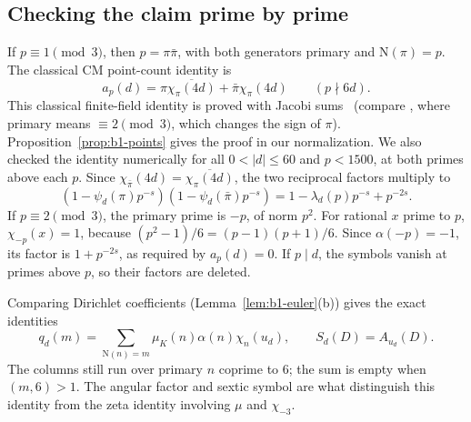 \documentclass[11pt]{article}
\numberwithin{equation}{section}
\newcommand{\N}{\mathrm N}
\newcommand{\muk}{\mu_K}
\begin{document}
\subsection{Checking the claim prime by prime}
If $p\equiv1\pmod3$, then $p=\pi\bar\pi$, with both generators primary
and $\N(\pi)=p$. The classical CM point-count identity is
\begin{equation}\label{eq:point-identity}
 a_p(d)=\pi\overline{\chi_\pi(4d)}
       +\bar\pi\chi_\pi(4d)\qquad(p\nmid6d).
\end{equation}
This classical finite-field identity is proved with Jacobi sums~\cite[Chapter~8]{IR} (compare
\cite[Chapter~18]{IR}, where primary means $\equiv2\pmod3$, which changes the sign of $\pi$).
Proposition~\ref{prop:b1-points} gives the proof in our normalization. We also checked the identity
numerically for all $0<|d|\le60$ and $p<1500$, at both primes above each $p$. Since
$\chi_{\bar\pi}(4d)=\overline{\chi_\pi(4d)}$, the two reciprocal
factors multiply to
\begin{equation}\label{eq:d011}
 (1-\psi_d(\pi)p^{-s})(1-\psi_d(\bar\pi)p^{-s})
 =1-\lambda_d(p)p^{-s}+p^{-2s}.
\end{equation}
If $p\equiv2\pmod3$, the primary prime is $-p$, of norm $p^2$.
For rational $x$ prime to $p$, $\chi_{-p}(x)=1$, because
$(p^2-1)/6=(p-1)(p+1)/6$. Since $\alpha(-p)=-1$, its factor is
$1+p^{-2s}$, as required by $a_p(d)=0$. If $p\mid d$, the symbols
vanish at primes above $p$, so their factors are deleted.

Comparing Dirichlet coefficients (Lemma~\ref{lem:b1-euler}(b)) gives the exact identities
\begin{equation}\label{eq:normgroup}
 q_d(m)=\sum_{\N(n)=m}\muk(n)\alpha(n)\chi_n(u_d),
 \qquad S_d(D)=A_{u_d}(D).
\end{equation}
The columns still run over primary $n$ coprime to $6$; the sum is empty
when $(m,6)>1$. The angular factor and sextic symbol are what distinguish
this identity from the zeta identity involving $\mu$ and $\chi_{-3}$.
\end{document}
